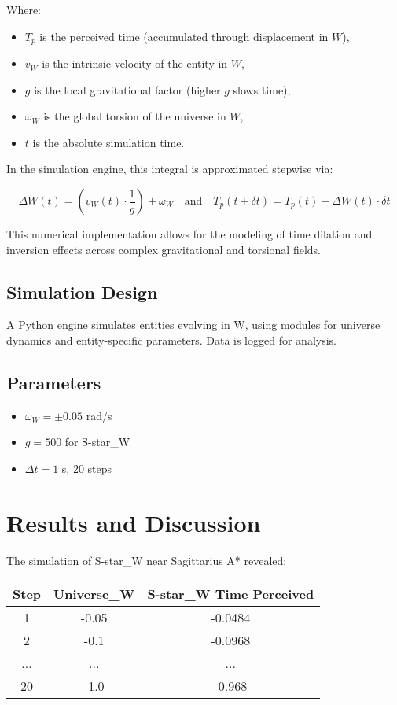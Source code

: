 \documentclass[12pt]{article}
\begin{document}
Where:

\begin{itemize}
\item $T_p$ is the perceived time (accumulated through displacement in $W$),
\item $v_W$ is the intrinsic velocity of the entity in $W$,
\item $g$ is the local gravitational factor (higher $g$ slows time),
\item $\omega_W$ is the global torsion of the universe in $W$,
\item $t$ is the absolute simulation time.
\end{itemize}

In the simulation engine, this integral is approximated stepwise via:

\[
\Delta W(t) = \left( v_W(t) \cdot \frac{1}{g} \right) + \omega_W
\quad \text{and} \quad
T_p(t + \delta t) = T_p(t) + \Delta W(t) \cdot \delta t
\]

This numerical implementation allows for the modeling of time dilation and inversion effects across complex gravitational and torsional fields.

\subsection{Simulation Design}
A Python engine simulates entities evolving in W, using modules for universe dynamics and entity-specific parameters. Data is logged for analysis.

\subsection{Parameters}
\begin{itemize}
\item $\omega_W = \pm 0.05$ rad/s
\item $g=500$ for S-star\_W
\item $\Delta t=1$ s, 20 steps
\end{itemize}

\section{Results and Discussion}

The simulation of S-star\_W near Sagittarius A* revealed:

\begin{center}
\begin{tabular}{|c|c|c|}
\hline
Step & Universe\_W & S-star\_W Time Perceived \\
\hline
1 & -0.05 & -0.0484 \\
2 & -0.1  & -0.0968 \\
... & ... & ... \\
20 & -1.0 & -0.968 \\
\hline
\end{tabular}
\end{center}
\end{document}
